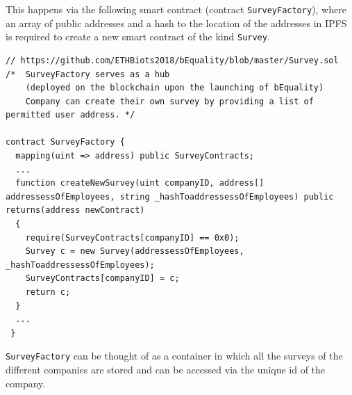 \documentclass[portrait,a4paper]{article}
\begin{document}
			This happens via the following smart contract (contract \texttt{SurveyFactory}), 
			where an array of public addresses and a hash to the location of the addresses in IPFS is 
			required to create a new smart contract of the kind \texttt{Survey}.\\[-4pt]
			\begin{lstlisting}
// https://github.com/ETHBiots2018/bEquality/blob/master/Survey.sol
/*	SurveyFactory serves as a hub 
	(deployed on the blockchain upon the launching of bEquality)
	Company can create their own survey by providing a list of permitted user address. */

contract SurveyFactory {
  mapping(uint => address) public SurveyContracts;
  ...
  function createNewSurvey(uint companyID, address[] addressessOfEmployees, string _hashToaddressessOfEmployees) public returns(address newContract)
  {
    require(SurveyContracts[companyID] == 0x0);
    Survey c = new Survey(addressessOfEmployees, _hashToaddressessOfEmployees);
    SurveyContracts[companyID] = c;
    return c;
  }
  ...
 }
			\end{lstlisting}
			\texttt{SurveyFactory} can be thought of as a container in which all the surveys of the 
			different companies are stored and can be accessed via the unique id of the company.
\end{document}
